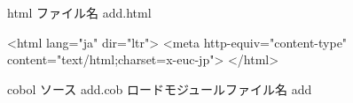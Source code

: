 
{\gt html} ファイル名 add.html

<html lang="ja" dir="ltr">
<meta http-equiv="content-type" content="text/html;charset=x-euc-jp">
</html>


{\gt cobol} ソース add.cob ロードモジュールファイル名 add
